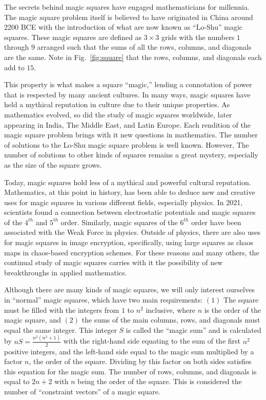 \documentclass[12pt]{report}
\begin{document}
\par The secrets behind magic squares have engaged mathematicians for millennia. The magic square
problem itself is believed to have originated in China around 2200 BCE with the introduction of
what are now known as “Lo-Shu” magic squares\cite{Cammann}. These magic squares are defined as
$3\times3$ grids with the numbers $1$ through $9$ arranged such that the sums of all the rows,
columns, and diagonals are the same. Note in Fig.~\ref{fig:square} that the rows, columns, and
diagonals each add to $15$.

\par This property is what makes a square ``magic,'' lending a connotation of power that is
respected by many ancient cultures. In many ways, magic squares have held a mythical reputation in
culture due to their unique properties. As mathematics evolved, so did the study of magic squares
worldwide, later appearing in India, The Middle East, and Latin Europe. Each rendition of the magic
square problem brings with it new questions in mathematics. The number of solutions to the Lo-Shu
magic square problem is well known. However, The number of solutions to other kinds of squares
remains a great mystery, especially as the size of the square grows.

\par Today, magic squares hold less of a mythical and powerful cultural reputation. Mathematics, at
this point in history, has been able to deduce new and creative uses for magic squares in various
different fields, especially physics. In 2021, scientists found a connection between electrostatic
potentials and magic squares of the $4^{th}$ and $5^{th}$ order\cite{Fahimi}. Similarly, magic
squares of the $6^{th}$ order have been associated with the Weak Force in physics\cite{ONeill}.
Outside of physics, there are also uses for magic squares in image encryption, specifically, using
large squares as chaos maps in chaos-based encryption schemes\cite{Wang}. For these reasons and
many others, the continual study of magic squares carries with it the possibility of new
breakthroughs in applied mathematics.

\par Although there are many kinds of magic squares, we will only interest ourselves in ``normal''
magic squares, which have two main requirements: $(1)$ The square must be filled with the integers
from $1$ to $n^2$ inclusive, where $n$ is the order of the magic square, and $(2)$ the sums of the
main columns, rows, and diagonals must equal the same integer. This integer $S$ is called the
``magic sum'' and is calculated by $nS = \frac{n^2(n^{2}+1)}{2}$ with the right-hand side equating
to the sum of the first $n^2$ positive integers, and the left-hand side equal to the magic sum
multiplied by a factor $n$, the order of the square. Dividing by this factor on both sides
satisfies this equation for the magic sum. The number of rows, columns, and diagonals is equal to
$2n+2$ with $n$ being the order of the square. This is considered the number of ``constraint
vectors'' of a magic square.
\end{document}
